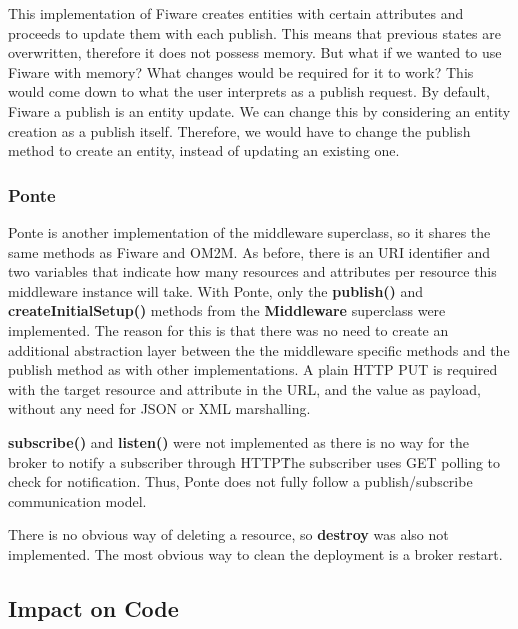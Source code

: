 \documentclass[conference]{IEEEtran}
\begin{document}
This implementation of Fiware creates entities with certain attributes and proceeds to update them with each publish. This means that previous states are overwritten, therefore it does not possess memory. But what if we wanted to use Fiware with memory? What changes would be required for it to work? This would come down to what the user interprets as a publish request. By default, Fiware a publish is an entity update. We can change this by considering an entity creation as a publish itself. Therefore, we would have to change the publish method to create an entity, instead of updating an existing one.

%
\subsubsection{Ponte}

Ponte is another implementation of the middleware superclass, so it shares the same methods as Fiware and OM2M.
As before, there is an URI identifier and two variables that indicate how many resources and attributes per resource this middleware instance will take. With Ponte, only the \textbf{publish()} and \textbf{createInitialSetup()} methods from the \textbf{Middleware} superclass were implemented. The reason for this is that there was no need to create an additional abstraction layer between the the middleware specific methods and the publish method as with other implementations. A plain HTTP PUT is required with the target resource and attribute in the URL, and the value as payload, without any need for JSON or XML marshalling.

\textbf{subscribe()} and \textbf{listen()} were not implemented as there is no way for the broker to notify a subscriber through HTTP\. The subscriber uses GET polling to check for notification. Thus, Ponte does not fully follow a publish/subscribe communication model.

There is no obvious way of deleting a resource, so \textbf{destroy} was also not implemented. The most obvious way to clean the deployment is a broker restart. 

\subsection{Impact on Code}
\end{document}
